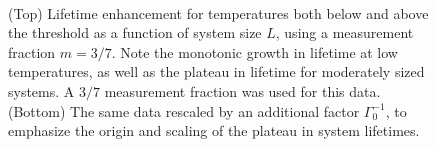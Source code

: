 \documentclass[twocolumn,superscriptaddress,aps,prb,floatfix]{revtex4-1}
\begin{document}
\begin{figure}
\begin{center}
\\
\vspace{-1.2\baselineskip}
\end{center}
\caption[justification=raggedright]{
(Top) Lifetime enhancement for temperatures both below and above the threshold as a function of system size $L$, using a measurement fraction $m=3/7$.  Note the monotonic growth in lifetime at low temperatures, as well as the plateau in lifetime for moderately sized systems. A $3/7$ measurement fraction was used for this data.
(Bottom) The same data rescaled by an additional factor $\Gamma_0^{-1}$, to emphasize the origin and scaling of the plateau in system lifetimes.}
\label{fig:LifetimeVsSystemSize}
\end{figure}
\end{document}
